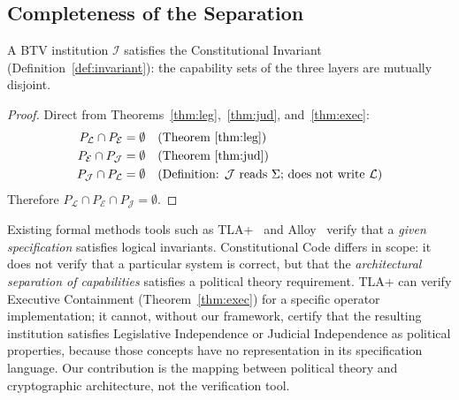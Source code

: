 \subsection{Completeness of the Separation}
\label{subsec:completeness}

\begin{corollary}
\label{cor:completeness}
A BTV institution $\mathcal{I}$ satisfies the Constitutional Invariant
(Definition~\ref{def:invariant}): the capability sets of the three
layers are mutually disjoint.
\end{corollary}

\begin{proof}
Direct from Theorems~\ref{thm:leg},~\ref{thm:jud},
and~\ref{thm:exec}:
\begin{align*}
  P_{\mathcal{L}} \cap P_{\mathcal{E}} &= \emptyset
    &&\text{(Theorem~\ref{thm:leg})} \\
  P_{\mathcal{E}} \cap P_{\mathcal{J}} &= \emptyset
    &&\text{(Theorem~\ref{thm:jud})} \\
  P_{\mathcal{J}} \cap P_{\mathcal{L}} &= \emptyset
    &&\text{(Definition: $\mathcal{J}$ reads $\Sigma$; does not write
    $\mathcal{L}$)}
\end{align*}
Therefore $P_{\mathcal{L}} \cap P_{\mathcal{E}} \cap P_{\mathcal{J}}
= \emptyset$.
\end{proof}

\begin{remark}
Existing formal methods tools such as TLA+~\cite{lamport2002} and
Alloy~\cite{jackson2012} verify that a \emph{given specification}
satisfies logical invariants. Constitutional Code differs in scope:
it does not verify that a particular system is correct, but that the
\emph{architectural separation of capabilities} satisfies a political
theory requirement. TLA+ can verify Executive Containment
(Theorem~\ref{thm:exec}) for a specific operator implementation;
it cannot, without our framework, certify that the resulting institution
satisfies Legislative Independence or Judicial Independence as
political properties, because those concepts have no representation
in its specification language. Our contribution is the mapping between
political theory and cryptographic architecture, not the verification
tool.
\end{remark}
